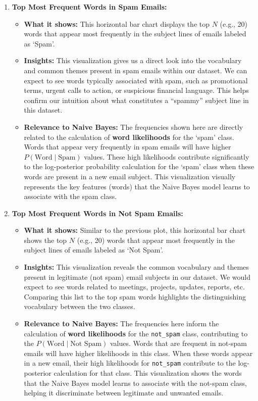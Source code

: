 \documentclass[12pt,letterpaper]{article}
\begin{document}
\begin{enumerate}
    \item \textbf{Top Most Frequent Words in Spam Emails:}
    \begin{itemize}
        \item \textbf{What it shows:} This horizontal bar chart displays the top $N$ (e.g., 20) words that appear most frequently in the subject lines of emails labeled as `Spam'.
        
        \item \textbf{Insights:} This visualization gives us a direct look into the vocabulary and common themes present in spam emails within our dataset. We can expect to see words typically associated with spam, such as promotional terms, urgent calls to action, or suspicious financial language. This helps confirm our intuition about what constitutes a ``spammy'' subject line in this dataset.
        
        \item \textbf{Relevance to Naive Bayes:} The frequencies shown here are directly related to the calculation of \textbf{word likelihoods} for the `spam' class. Words that appear very frequently in spam emails will have higher $P(\text{Word} \mid \text{Spam})$ values. These high likelihoods contribute significantly to the log-posterior probability calculation for the `spam' class when these words are present in a new email subject. This visualization visually represents the key features (words) that the Naive Bayes model learns to associate with the spam class.
    \end{itemize}

    \item \textbf{Top Most Frequent Words in Not Spam Emails:}
    \begin{itemize}
        \item \textbf{What it shows:} Similar to the previous plot, this horizontal bar chart shows the top $N$ (e.g., 20) words that appear most frequently in the subject lines of emails labeled as `Not Spam'.
        
        \item \textbf{Insights:} This visualization reveals the common vocabulary and themes present in legitimate (not spam) email subjects in our dataset. We would expect to see words related to meetings, projects, updates, reports, etc. Comparing this list to the top spam words highlights the distinguishing vocabulary between the two classes.
        
        \item \textbf{Relevance to Naive Bayes:} The frequencies here inform the calculation of \textbf{word likelihoods} for the \texttt{not\_spam} class, contributing to the $P(\text{Word} \mid \text{Not Spam})$ values. Words that are frequent in not-spam emails will have higher likelihoods in this class. When these words appear in a new email, their high likelihoods for \texttt{not\_spam} contribute to the log-posterior calculation for that class. This visualization shows the words that the Naive Bayes model learns to associate with the not-spam class, helping it discriminate between legitimate and unwanted emails.
    \end{itemize}
\end{enumerate}
\end{document}
